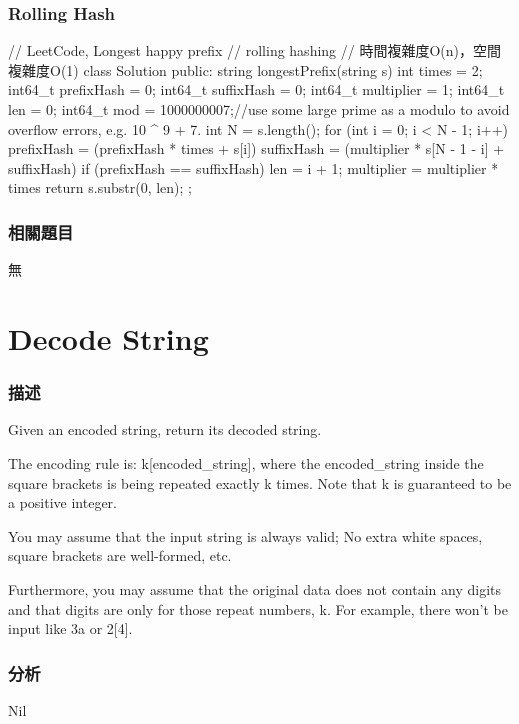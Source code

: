 \subsubsection{Rolling Hash}
\begin{Code}
// LeetCode, Longest happy prefix
// rolling hashing
// 時間複雜度O(n)，空間複雜度O(1)
class Solution {
public:
    string longestPrefix(string s) {
        int times = 2;
        int64_t prefixHash = 0;
        int64_t suffixHash = 0;
        int64_t multiplier = 1;
        int64_t len = 0;
        int64_t mod = 1000000007;//use some large prime as a modulo to avoid overflow errors, e.g. 10 ^ 9 + 7.
        int N = s.length();
        for (int i = 0; i < N - 1; i++) {
            prefixHash = (prefixHash * times + s[i]) %
            suffixHash = (multiplier * s[N - 1 - i] + suffixHash) %
            if (prefixHash == suffixHash)
                len = i + 1;
            multiplier = multiplier * times %
        }
        return s.substr(0, len);
    }
};
\end{Code}

\subsubsection{相關題目}
\begindot
\item 無
\myenddot

\section{Decode String} %
\label{sec:decode-string}


\subsubsection{描述}
Given an encoded string, return its decoded string.

The encoding rule is: k[encoded_string], where the encoded_string inside the square brackets is being repeated exactly k times. Note that k is guaranteed to be a positive integer.

You may assume that the input string is always valid; No extra white spaces, square brackets are well-formed, etc.

Furthermore, you may assume that the original data does not contain any digits and that digits are only for those repeat numbers, k. For example, there won't be input like 3a or 2[4].


\subsubsection{分析}
Nil

